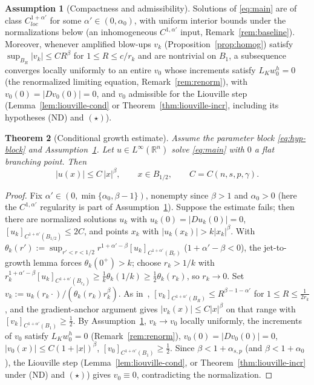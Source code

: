 \documentclass[11pt]{amsart}
\theoremstyle{plain}
\newtheorem{theorem}{Theorem}[section]
\theoremstyle{definition}
\newtheorem{assumption}[theorem]{Assumption}
\theoremstyle{remark}
\newcommand{\R}{\mathbb{R}}
\newcommand{\al}{\alpha}
\newcommand{\asp}{\alpha_{s,p}}
\begin{document}
\begin{assumption}[Compactness and admissibility]\label{ass:compact}
Solutions of \eqref{eq:main} are of class $C^{1+\al'}_{loc}$ for some
$\al'\in(0,\al_0)$, with uniform interior bounds under the normalizations
below \textnormal{(}an inhomogeneous $C^{1,\al'}$ input,
Remark~\ref{rem:baseline}\textnormal{)}. Moreover, whenever amplified blow-ups
$v_k$ (Proposition~\ref{prop:homog}) satisfy $\sup_{B_R}|v_k|\le CR^{\beta}$ for
$1\le R\le c/r_k$ and are nontrivial on $B_1$, a subsequence converges locally
uniformly to an entire $v_0$ whose increments satisfy $L_{K}w_0^h=0$ (the
renormalized limiting equation, Remark~\ref{rem:renorm}), with
$v_0(0)=|Dv_0(0)|=0$, and
$v_0$ admissible for the Liouville step (Lemma~\ref{lem:liouville-cond} or
Theorem~\ref{thm:liouville-incr}, including its hypotheses \textnormal{(ND)}
and $(\star)$).
\end{assumption}

\begin{theorem}[Conditional growth estimate]\label{thm:growth}
Assume the parameter block \eqref{eq:hyp-block} and
Assumption~\ref{ass:compact}. Let $u\in L^\infty(\R^n)$ solve \eqref{eq:main}
with $0$ a flat branching point. Then
\[
  |u(x)|\le C\,|x|^{\beta},\qquad x\in B_{1/2},\qquad C=C(n,s,p,\gamma).
\]
\end{theorem}
\begin{proof}
Fix $\al'\in(0,\min\{\al_0,\beta-1\})$, nonempty since $\beta>1$ and
$\al_0>0$ (here the $C^{1,\al'}$ regularity is part of
Assumption~\ref{ass:compact}). Suppose the estimate fails; then there are
normalized solutions $u_k$ with $u_k(0)=|Du_k(0)|=0$,
$[u_k]_{C^{1+\al'}(B_{1/2})}\le 2C$, and points $x_k$ with
$|u_k(x_k)|>k|x_k|^{\beta}$. With
$\theta_k(r'):=\sup_{r'<r<1/2}r^{1+\al'-\beta}[u_k]_{C^{1+\al'}(B_r)}$
($1+\al'-\beta<0$), the jet-to-growth lemma forces $\theta_k(0^+)>k$; choose
$r_k>1/k$ with
$r_k^{1+\al'-\beta}[u_k]_{C^{1+\al'}(B_{r_k})}\ge\frac1k\theta_k(1/k)\ge
\frac12\theta_k(r_k)$, so $r_k\to0$. Set
$v_k:=u_k(r_k\cdot)/(\theta_k(r_k)r_k^{\beta})$. As in~\cite[(33)]{CP},
$[v_k]_{C^{1+\al'}(B_R)}\le R^{\beta-1-\al'}$ for $1\le R\le\frac1{2r_k}$, and
the gradient-anchor argument gives $|v_k(x)|\le C|x|^{\beta}$ on that range with
$[v_k]_{C^{1+\al'}(B_1)}\ge\frac12$. By Assumption~\ref{ass:compact},
$v_k\to v_0$ locally uniformly, the increments of $v_0$ satisfy $L_K w_0^h=0$
(Remark~\ref{rem:renorm}), $v_0(0)=|Dv_0(0)|=0$,
$|v_0(x)|\le C(1+|x|)^{\beta}$, $[v_0]_{C^{1+\al'}(B_1)}\ge\frac12$. Since
$\beta<1+\asp$ (and $\beta<1+\al_0$), the Liouville step
(Lemma~\ref{lem:liouville-cond}, or Theorem~\ref{thm:liouville-incr} under
\textnormal{(ND)} and $(\star)$) gives $v_0\equiv0$, contradicting the
normalization.
\end{proof}
\end{document}

